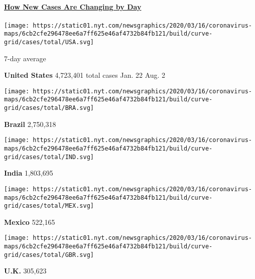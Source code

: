 \subsection{}

\hypertarget{how-new-cases-are-changing-by-day}{%
\paragraph{\texorpdfstring{\href{https://www.nytimes.com/interactive/2020/world/coronavirus-maps.html}{How
New Cases Are Changing by
Day}}{How New Cases Are Changing by Day}}\label{how-new-cases-are-changing-by-day}}

\href{https://www.nytimes.com/interactive/2020/us/coronavirus-us-cases.html}{}

\texttt{[image: https://static01.nyt.com/newsgraphics/2020/03/16/coronavirus-maps/6cb2cfe296478ee6a7ff625e46af4732b84fb121/build/curve-grid/cases/total/USA.svg]}

7-day average

\textbf{United States} 4,723,401 total cases Jan. 22 Aug. 2
\href{https://www.nytimes.com/interactive/2020/world/americas/brazil-coronavirus-cases.html}{}

\texttt{[image: https://static01.nyt.com/newsgraphics/2020/03/16/coronavirus-maps/6cb2cfe296478ee6a7ff625e46af4732b84fb121/build/curve-grid/cases/total/BRA.svg]}

\textbf{Brazil} 2,750,318
\href{https://www.nytimes.com/interactive/2020/world/asia/india-coronavirus-cases.html}{}

\texttt{[image: https://static01.nyt.com/newsgraphics/2020/03/16/coronavirus-maps/6cb2cfe296478ee6a7ff625e46af4732b84fb121/build/curve-grid/cases/total/IND.svg]}

\textbf{India} 1,803,695
\href{https://www.nytimes.com/interactive/2020/world/americas/mexico-coronavirus-cases.html}{}

\texttt{[image: https://static01.nyt.com/newsgraphics/2020/03/16/coronavirus-maps/6cb2cfe296478ee6a7ff625e46af4732b84fb121/build/curve-grid/cases/total/MEX.svg]}

\textbf{Mexico} 522,165
\href{https://www.nytimes.com/interactive/2020/world/europe/united-kingdom-coronavirus-cases.html}{}

\texttt{[image: https://static01.nyt.com/newsgraphics/2020/03/16/coronavirus-maps/6cb2cfe296478ee6a7ff625e46af4732b84fb121/build/curve-grid/cases/total/GBR.svg]}

\textbf{U.K.} 305,623
\href{https://www.nytimes.com/interactive/2020/world/canada/canada-coronavirus-cases.html}{}

